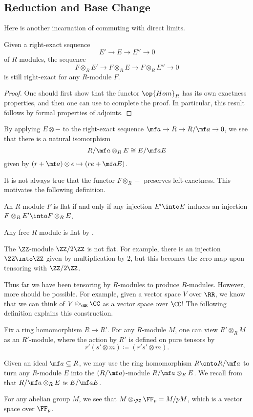 \documentclass[../notes.tex]{subfiles}
\begin{document}
\subsection{Reduction and Base Change}
Here is another incarnation of commuting with direct limits.
\begin{lemma}
	Given a right-exact sequence
	\[E'\to E\to E''\to0\]
	of $R$-modules, the sequence
	\[F\otimes_RE'\to F\otimes_RE\to F\otimes_RE''\to0\]
	is still right-exact for any $R$-module $F$.
\end{lemma}
\begin{proof}
	One should first show that the functor $\op{Hom}_R$ has its own exactness properties, and then one can use  to complete the proof. In particular, this result follows by formal properties of adjoints.
\end{proof}
\begin{example}[reduction] \label{ex:tensor-reduce}
	By applying $E\otimes-$ to the right-exact sequence $\mf a\to R\to R/\mf a\to0$, we see that there is a natural isomorphism
	\[R/\mf a\otimes_RE\cong E/\mf aE\]
	given by $(r+\mf a)\otimes e\mapsto (re+\mf aE)$.
\end{example}
It is not always true that the functor $F\otimes_R-$ preserves left-exactness. This motivates the following definition.
\begin{definition}[flat]
	An $R$-module $F$ is flat if and only if any injection $E'\into E$ induces an injection $F\otimes_RE'\into F\otimes_RE$.
\end{definition}
\begin{example}
	Any free $R$-module is flat by .
\end{example}
\begin{nex}
	The $\ZZ$-module $\ZZ/2\ZZ$ is not flat. For example, there is an injection $\ZZ\into\ZZ$ given by multiplication by $2$, but this becomes the zero map upon tensoring with $\ZZ/2\ZZ$.
\end{nex}
Thus far we have been tensoring by $R$-modules to produce $R$-modules. However, more should be possible. For example, given a vector space $V$ over $\RR$, we know that we can think of $V\otimes_\RR\CC$ as a vector space over $\CC$! The following definition explains this construction.
\begin{definition}
	Fix a ring homomorphism $R\to R'$. For any $R$-module $M$, one can view $R'\otimes_RM$ as an $R'$-module, where the action by $R'$ is defined on pure tensors by
	\[r'(s'\otimes m)\coloneqq(r's'\otimes m).\]
\end{definition}
\begin{example}
	Given an ideal $\mf a\subseteq R$, we may use the ring homomorphism $R\onto R/\mf a$ to turn any $R$-module $E$ into the $(R/\mf a)$-module $R/\mf a\otimes_RE$. We recall from  that $R/\mf a\otimes_RE$ is $E/\mf aE$.
\end{example}
\begin{example}
	For any abelian group $M$, we see that $M\otimes_\ZZ\FF_p=M/pM$, which is a vector space over $\FF_p$.
\end{example}
\end{document}
